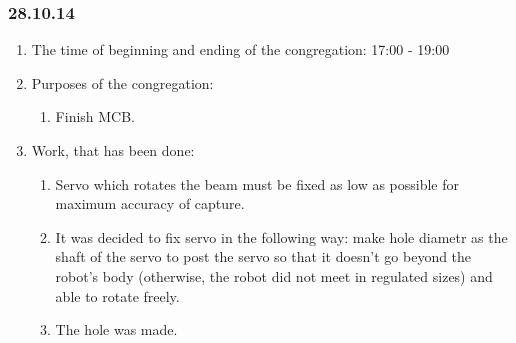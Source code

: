 
\subsubsection{28.10.14}

\begin{enumerate}
	\item The time of beginning and ending of the congregation:
	17:00 - 19:00
	\item Purposes of the congregation:
	\begin{enumerate}
	  \item Finish MCB.
	  
    \end{enumerate}
    
	\item Work, that has been done:
	\begin{enumerate}
	  \item Servo which rotates the beam must be fixed as low as possible for maximum accuracy of capture.
      
      \item It was decided to fix servo in the following way: make hole diametr as the shaft of the servo to post the servo so that it doesn't go beyond the robot's body (otherwise, the robot did not meet in regulated sizes) and able to rotate freely.
      
      \item The hole was made.
      

\end{enumerate}
\end{enumerate}
